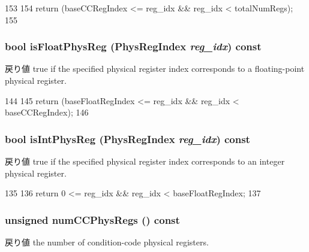 \begin{DoxyCode}
153     {
154         return (baseCCRegIndex <= reg_idx && reg_idx < totalNumRegs);
155     }
\end{DoxyCode}
\hypertarget{classPhysRegFile_ad4633a6224fc5694bdf2d9558d20501f}{
\subsubsection[{isFloatPhysReg}]{\setlength{\rightskip}{0pt plus 5cm}bool isFloatPhysReg ({\bf PhysRegIndex} {\em reg\_\-idx}) const}}
\label{classPhysRegFile_ad4633a6224fc5694bdf2d9558d20501f}
\begin{DoxyReturn}{戻り値}
true if the specified physical register index corresponds to a floating-\/point physical register. 
\end{DoxyReturn}



\begin{DoxyCode}
144     {
145         return (baseFloatRegIndex <= reg_idx && reg_idx < baseCCRegIndex);
146     }
\end{DoxyCode}
\hypertarget{classPhysRegFile_a4484974c71716e3a2e14b8e5207a5002}{
\subsubsection[{isIntPhysReg}]{\setlength{\rightskip}{0pt plus 5cm}bool isIntPhysReg ({\bf PhysRegIndex} {\em reg\_\-idx}) const}}
\label{classPhysRegFile_a4484974c71716e3a2e14b8e5207a5002}
\begin{DoxyReturn}{戻り値}
true if the specified physical register index corresponds to an integer physical register. 
\end{DoxyReturn}



\begin{DoxyCode}
135     {
136         return 0 <= reg_idx && reg_idx < baseFloatRegIndex;
137     }
\end{DoxyCode}
\hypertarget{classPhysRegFile_ac201fa880ee34a4d30c73c7f0adedcef}{
\subsubsection[{numCCPhysRegs}]{\setlength{\rightskip}{0pt plus 5cm}unsigned numCCPhysRegs () const}}
\label{classPhysRegFile_ac201fa880ee34a4d30c73c7f0adedcef}
\begin{DoxyReturn}{戻り値}
the number of condition-\/code physical registers. 
\end{DoxyReturn}



